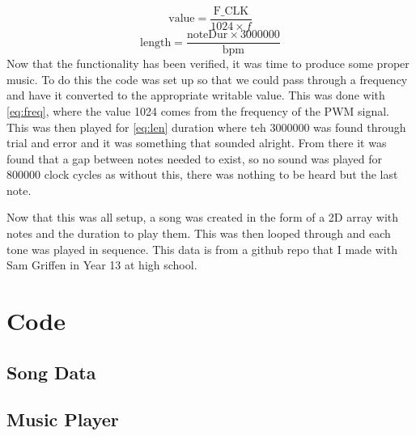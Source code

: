 \documentclass[a4paper, 12pt]{article}
\begin{document}
		\par
			\begin{equation}
				\label{eq:freq}
				\text{value} = \frac{\text{F\_CLK}}{1024 \times f}
			\end{equation}
			\begin{equation}
				\label{eq:len}
				\text{length} = \frac{\text{noteDur} \times 3000000}{\text{bpm}}
			\end{equation}
		Now that the functionality has been verified, it was time to produce some proper music. To do this the code was set up so that we could pass through a frequency and have it converted to the appropriate writable value. This was done with \cref{eq:freq}, where the value 1024 comes from the frequency of the PWM signal. This was then played for \cref{eq:len} duration where teh 3000000 was found through trial and error and it was something that sounded alright. From there it was found that a gap between notes needed to exist, so no sound was played for 800000 clock cycles as without this, there was nothing to be heard but the last note.
		\par
		Now that this was all setup, a song was created in the form of a 2D array with notes and the duration to play them. This was then looped through and each tone was played in sequence. This data is from a github repo that I made with Sam Griffen in Year 13 at high school.
	\section{Code}
		\subsection{Song Data}
			
		\subsection{Music Player}
			



\end{document}
